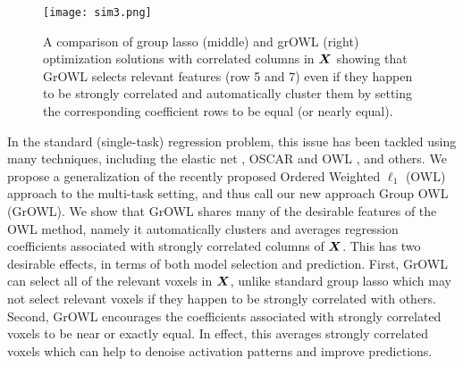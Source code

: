\begin{figure}[!h]
  \centering
    \texttt{[image: sim3.png]}
    \qquad
    \caption{A comparison of group lasso (middle) and grOWL (right) optimization
      solutions with correlated columns in $\boldsymbol{X}$ showing that GrOWL selects
      relevant features (row 5 and 7) even if they happen to be strongly
      correlated and automatically cluster them by setting the corresponding
      coefficient rows to be equal (or nearly equal).}
    \label{Fig:sim}
\end{figure}

In the standard (single-task) regression problem, this issue has been tackled
using many techniques, including the elastic net \cite{EN}, OSCAR \cite{oscar}
and OWL \cite{owl}, and others. We propose a generalization of the recently
proposed Ordered Weighted $\ell_1$ (OWL) approach to the multi-task setting, and
thus call our new approach Group OWL (GrOWL). We show that GrOWL shares many of
the desirable features of the OWL method, namely it automatically clusters and
averages regression coefficients associated with strongly correlated columns of
$\boldsymbol{X}$. This has two desirable effects, in terms of both model selection and
prediction. First, GrOWL can select all of the relevant voxels in $\boldsymbol{X}$, unlike
standard group lasso which may not select relevant voxels if they happen to be
strongly correlated with others. Second, GrOWL encourages the coefficients
associated with strongly correlated voxels to be near or exactly equal. In
effect, this averages strongly correlated voxels which can help to denoise
activation patterns and improve predictions.
